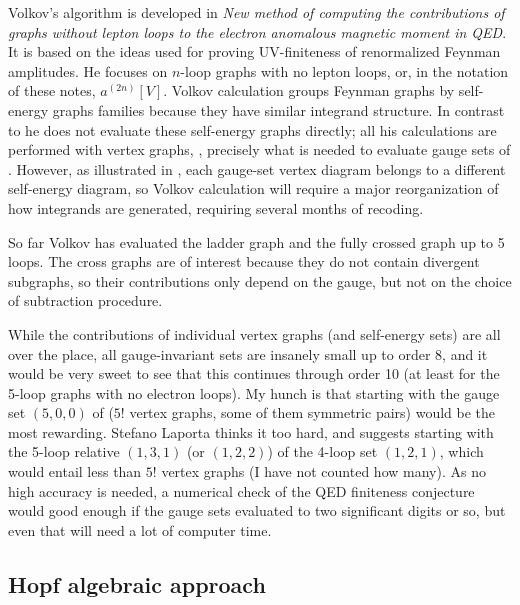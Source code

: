 Volkov's algorithm is developed in {\em New method of computing the
contributions of graphs without lepton loops to the electron anomalous
magnetic moment in {QED}}. It is based on the ideas used for
proving UV-finiteness of renormalized Feynman
amplitudes. He focuses on $n$-loop graphs with no
lepton loops, or, in the notation of these notes, $a^{(2n)}[V]$.
%
Volkov calculation groups Feynman graphs by self-energy graphs families
because they have similar integrand structure. In contrast to
 he does not evaluate
these self-energy graphs directly; all his calculations are performed
with vertex graphs, \ie, precisely what is needed to evaluate gauge sets
of . However, as illustrated in
, each gauge-set vertex diagram belongs to a
different self-energy diagram, so Volkov calculation will require a major
reorganization of how integrands are generated, requiring several months
of recoding.

So far Volkov  has evaluated the ladder graph
and the fully crossed graph
up to 5 loops. The cross graphs are of interest because they do not
contain divergent subgraphs, so their contributions only depend on the
gauge, but not on the choice of subtraction procedure.

While the contributions of individual vertex graphs (and self-energy
sets) are all over the place, all gauge-invariant sets are
insanely small up to order 8, and it would be very sweet to see that this
continues through order 10 (at least for the 5-loop graphs with no
electron loops).
My hunch is that starting with the gauge set $(5,0,0)$ of
 ($5!$ vertex graphs, some of them symmetric pairs)
would be the most rewarding.
Stefano Laporta thinks it too hard, and suggests starting with the 5-loop
relative
$(1,3,1)$ (or $(1,2,2)$) of the 4-loop set $(1,2,1)$,
which would entail less than $5!$ vertex graphs (I have not counted
how many). As no high accuracy is needed, a numerical check of the QED
finiteness conjecture would good enough if the gauge sets evaluated
to two significant digits or so, but even that will need a lot of
computer time.

\subsection{Hopf algebraic approach}
\label{sect:HopfAlgebra}


